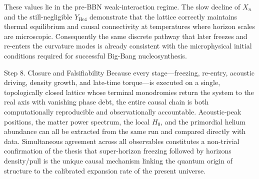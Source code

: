 These values lie in the pre-BBN weak-interaction regime. The slow decline of \(X_n\) and the still-negligible \(Y_{\mathrm{He4}}\) demonstrate that the lattice correctly maintains thermal equilibrium and causal connectivity at temperatures where horizon scales are microscopic. Consequently the same discrete pathway that later freezes and re-enters the curvature modes is already consistent with the microphysical initial conditions required for successful Big-Bang nucleosynthesis.

Step 8. Closure and Falsifiability  
Because every stage—freezing, re-entry, acoustic driving, density growth, and late-time torque—is executed on a single, topologically closed lattice whose terminal monodromies return the system to the real axis with vanishing phase debt, the entire causal chain is both computationally reproducible and observationally accountable. Acoustic-peak positions, the matter power spectrum, the local \(H_0\), and the primordial helium abundance can all be extracted from the same run and compared directly with data. Simultaneous agreement across all observables constitutes a non-trivial confirmation of the thesis that super-horizon freezing followed by horizons density/pull is the unique causal mechanism linking the quantum origin of structure to the calibrated expansion rate of the present universe.
